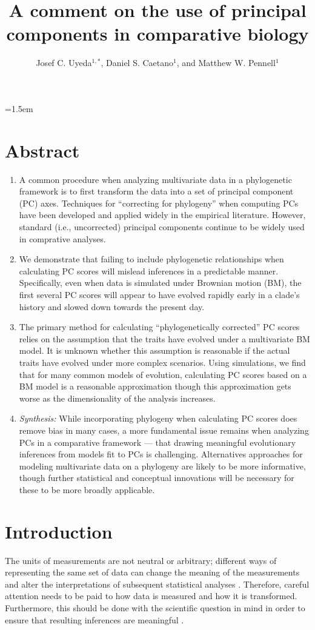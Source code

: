 \documentclass[a4paper,12pt]{article}
\title{A comment on the use of principal components in comparative biology}
\author{
Josef C. Uyeda$^{1,*}$, Daniel S. Caetano$^1$, and Matthew W. Pennell$^1$
}
\date{}
\affiliation{
 $^{1}$ Department of Biological Sciences \& Institute for Bioinformatics and Evolutionary Studies, University of Idaho, Moscow, ID 83844, U.S.A.\\ 
 $^{*}$ Email for correspondence: \texttt{pseudacris@gmail.com}\\
}
\begin{document}
\mstitlepage
\parindent=1.5em
\addtolength{\parskip}{.3em}
\vfill

\section{Abstract}
\begin{enumerate}
\item A common procedure when analyzing multivariate data in a phylogenetic framework is to first transform the data into a set of principal component (PC) axes. Techniques for ``correcting for phylogeny'' when computing PCs have been developed and applied widely in the empirical literature. However, standard (i.e., uncorrected) principal components continue to be widely used in comprative analyses.

\item We demonstrate that failing to include phylogenetic relationships when calculating PC scores will mislead inferences in a predictable manner. Specifically, even when data is simulated under Brownian motion (BM), the first several PC scores will appear to have evolved rapidly early in a clade's history and slowed down towards the present day.

\item The primary method for calculating ``phylogenetically corrected'' PC scores relies on the assumption that the traits have evolved under a multivariate BM model. It is unknown whether this assumption is reasonable if the actual traits have evolved under more complex scenarios. Using simulations, we find that for many common models of evolution, calculating PC scores based on a BM model is a reasonable approximation though this approximation gets worse as the dimensionality of the analysis increases.

\item \emph{Synthesis:} While incorporating phylogeny when calculating PC scores does remove bias in many cases, a more fundamental issue remains when analyzing PCs in a comparative framework --- that drawing meaningful evolutionary inferences from models fit to PCs is challenging. Alternatives approaches for modeling multivariate data on a phylogeny are likely to be more informative, though further statistical and conceptual innovations will be necessary for these to be more broadly applicable.
\end{enumerate} 

\newpage

\section{Introduction}
The units of measurements are not neutral or arbitrary; different ways of representing the same set of data can change the meaning of the measurements and alter the interpretations of subsequent statistical analyses \citep{Hand2004, HansenHoule2008, Houle2011}. Therefore, careful attention needs to be paid to how data is measured and how it is transformed. Furthermore, this should be done with the scientific question in mind in order to ensure that resulting inferences are meaningful \citep{Houle2011}. 
\end{document}

